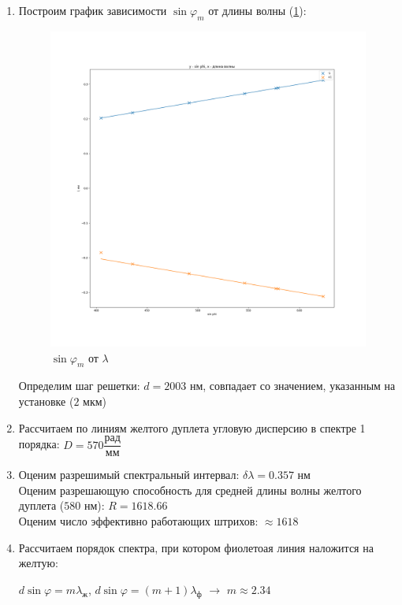 \documentclass[a4paper, 12pt]{article}
\renewcommand{\phi}{\varphi}
\begin{document}
\begin{enumerate}
    \item Построим график зависимости $\sin \phi_m$ от длины волны (\ref{graph1}):

    \begin{figure}[!h]
        \includegraphics[scale = 0.4]{graph1.png}
        \centering
        \caption{$\sin \phi_m$ от $\lambda$}
        \label{graph1}
    \end{figure}

    Определим шаг решетки: $d = 2003$ нм, совпадает со значением, указанным на установке ($2$ мкм)

    \item Рассчитаем по линиям желтого дуплета угловую дисперсию в спектре 1 порядка: $D = 570 \dfrac{\text{рад}}{\text{мм}}$ 
    
    \item Оценим разрешимый спектральный интервал: $\delta \lambda = 0.357$ нм\\
    
    Оценим разрешающую способность для средней длины волны желтого дуплета ($580$ нм): $R = 1618.66$ \\

    Оценим число эффективно работающих штрихов: $\approx 1618$

    \item Рассчитаем порядок спектра, при котором фиолетоая линия наложится на желтую:
    
    $d \sin \phi = m \lambda_ж$, $d \sin \phi = (m + 1) \lambda_ф$ $\rightarrow$ $m \approx 2.34$
\end{enumerate}
\end{document}
